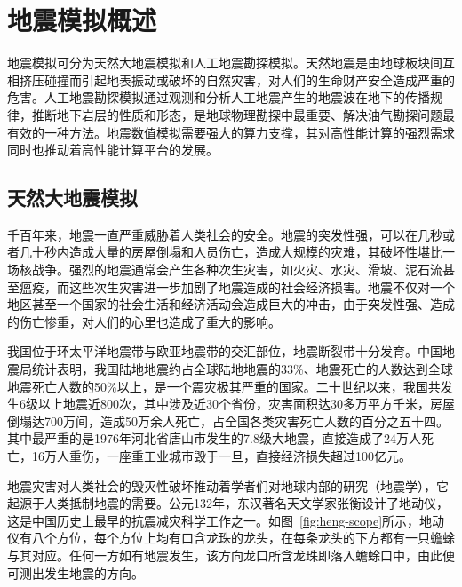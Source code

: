 
\section{地震模拟概述}
地震模拟可分为天然大地震模拟和人工地震勘探模拟。天然地震是由地球板块间互相挤压碰撞而引起地表振动或破坏的自然灾害，对人们的生命财产安全造成严重的危害\cite{earthquakebaidu}。人工地震勘探模拟通过观测和分析人工地震产生的地震波在地下的传播规律，推断地下岩层的性质和形态，是地球物理勘探中最重要、解决油气勘探问题最有效的一种方法\cite{地震勘探}。地震数值模拟需要强大的算力支撑，其对高性能计算的强烈需求同时也推动着高性能计算平台的发展。

\subsection{天然大地震模拟}

千百年来，地震一直严重威胁着人类社会的安全。地震的突发性强，可以在几秒或者几十秒内造成大量的房屋倒塌和人员伤亡，造成大规模的灾难，其破坏性堪比一场核战争。强烈的地震通常会产生各种次生灾害，如火灾、水灾、滑坡、泥石流甚至瘟疫，而这些次生灾害进一步加剧了地震造成的社会经济损害。地震不仅对一个地区甚至一个国家的社会生活和经济活动会造成巨大的冲击，由于突发性强、造成的伤亡惨重，对人们的心里也造成了重大的影响。

我国位于环太平洋地震带与欧亚地震带的交汇部位，地震断裂带十分发育。中国地震局统计表明，我国陆地地震约占全球陆地地震的33\%、地震死亡的人数达到全球地震死亡人数的50\%以上，是一个震灾极其严重的国家\cite{地震局}。二十世纪以来，我国共发生6级以上地震近800次，其中涉及近30个省份，灾害面积达30多万平方千米，房屋倒塌达700万间，造成50万余人死亡，占全国各类灾害死亡人数的百分之五十四。其中最严重的是1976年河北省唐山市发生的7.8级大地震，直接造成了24万人死亡，16万人重伤，一座重工业城市毁于一旦，直接经济损失超过100亿元\cite{地震局}。

地震灾害对人类社会的毁灭性破坏推动着学者们对地球内部的研究（地震学），它起源于人类抵制地震的需要。公元132年，东汉著名天文学家张衡设计了地动仪，这是中国历史上最早的抗震减灾科学工作之一\citep{stein2009introduction}。如图~\ref{fig:heng-scope}所示，地动仪有八个方位，每个方位上均有口含龙珠的龙头，在每条龙头的下方都有一只蟾蜍与其对应。任何一方如有地震发生，该方向龙口所含龙珠即落入蟾蜍口中，由此便可测出发生地震的方向\cite{seismoscopewiki}。

